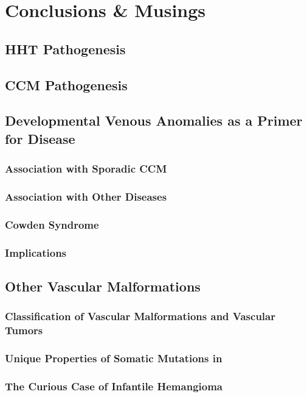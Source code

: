 \chapter{Conclusions \& Musings}

\section{HHT Pathogenesis}

\section{CCM Pathogenesis}

\section{Developmental Venous Anomalies as a Primer for Disease}
\subsection{Association with Sporadic CCM}
\subsection{Association with Other Diseases}
\subsection{Cowden Syndrome}
\subsection{Implications}

\section{Other Vascular Malformations}
\subsection{Classification of Vascular Malformations and Vascular Tumors}
\subsection{Unique Properties of Somatic Mutations in }
\subsection{The Curious Case of Infantile Hemangioma}

